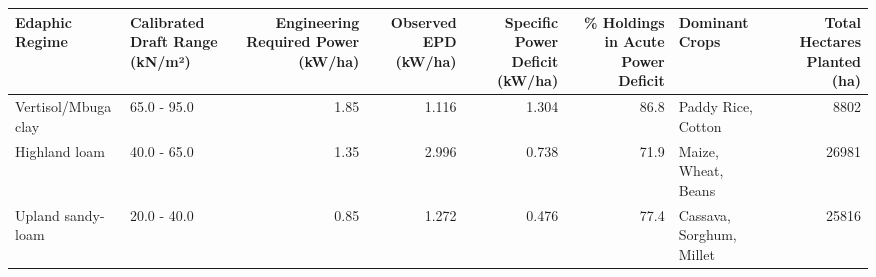 \begin{tabular}{llrrrrlr}
\toprule
 Edaphic Regime      & Calibrated Draft Range (kN/m²)   &   Engineering Required Power (kW/ha) &   Observed EPD (kW/ha) &   Specific Power Deficit (kW/ha) &   \% Holdings in Acute Power Deficit & Dominant Crops           &   Total Hectares Planted (ha) \\
\midrule
 Vertisol/Mbuga clay & 65.0 - 95.0                      &                                 1.85 &                  1.116 &                            1.304 &                                86.8 & Paddy Rice, Cotton       &                          8802 \\
 Highland loam       & 40.0 - 65.0                      &                                 1.35 &                  2.996 &                            0.738 &                                71.9 & Maize, Wheat, Beans      &                         26981 \\
 Upland sandy-loam   & 20.0 - 40.0                      &                                 0.85 &                  1.272 &                            0.476 &                                77.4 & Cassava, Sorghum, Millet &                         25816 \\
\bottomrule
\end{tabular}